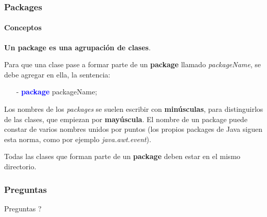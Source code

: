 \documentclass{beamer}
\begin{document}
        \begin{frame}
			\frametitle{Packages}
			\framesubtitle{Conceptos}

			\begin{block}{}
			    {\scriptsize
                    \textbf{Un package es una agrupaci\'on de clases}.
			    }
			\end{block}

			\begin{block}{}
			    {\scriptsize
                    Para que una clase pase a formar parte de un \textbf{package} llamado \emph{packageName}, se debe agregar en ella, la sentencia:
                    \begin{itemize}
			            \item[-] \textcolor{blue}{\textbf{package}} packageName;
			        \end{itemize}
			    }
			\end{block}
			
			\begin{block}{}
			    {\scriptsize
                    Los nombres de los \emph{packages} se suelen escribir con \textbf{min\'usculas}, para distinguirlos de las clases, que empiezan por \textbf{may\'uscula}. El nombre de un package puede constar de varios nombres unidos por puntos (los propios packages de Java siguen esta norma, como por ejemplo \emph{java.awt.event}).
			    }
			\end{block}
			
			\begin{block}{}
			    {\scriptsize
                    Todas las clases que forman parte de un \textbf{package} deben estar en el mismo directorio.
			    }
			\end{block}
	
		\end{frame}			
		
		\begin{frame}
			\frametitle{Preguntas}

			\hspace{4cm}\huge{Preguntas ?}
		
		\end{frame}
	
\end{document}
